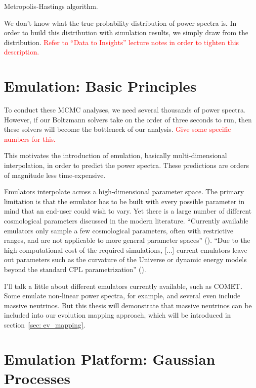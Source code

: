 Metropolis-Hastings algorithm.

We don't know what the true probability distribution of power spectra is. In order to build this distribution with simulation results, we simply draw from the distribution. \textcolor{red}{Refer to ``Data to Insights'' lecture notes in order to tighten this description.}

\section{Emulation: Basic Principles}
\label{sec: emulation_intro}

To conduct these MCMC analyses, we need several thousands of power spectra. However, if our Boltzmann solvers take on the order of three seconds to run, then these solvers will become the bottleneck of our analysis. \textcolor{red}{Give some specific numbers for this.}

This motivates the introduction of emulation, basically multi-dimensional interpolation, in order to predict the power spectra. These predictions are orders of magnitude less time-expensive. 

Emulators interpolate across a high-dimensional parameter space. The primary
limitation is that the emulator has to be built with every possible parameter
in mind that an end-user could wish to vary. Yet there is a large number of
different cosmological parameters discussed in the modern literature.
``Currently available emulators only sample a few cosmological parameters,
often with restrictive ranges, and are not applicable to more general parameter
spaces'' (). ``Due to the high computational cost of the required
simulations, [...] current emulators leave out parameters such as the curvature
of the Universe or dynamic energy models beyond the standard CPL
parametrization'' ().

I'll talk a little about different emulators currently available, such as COMET. Some emulate non-linear power spectra, for example, and several even include massive neutrinos. But this thesis will demonstrate that massive neutrinos can be included into our evolution mapping approach, which will be introduced in section~\ref{sec: ev_mapping}.


\section{Emulation Platform: Gaussian Processes}

